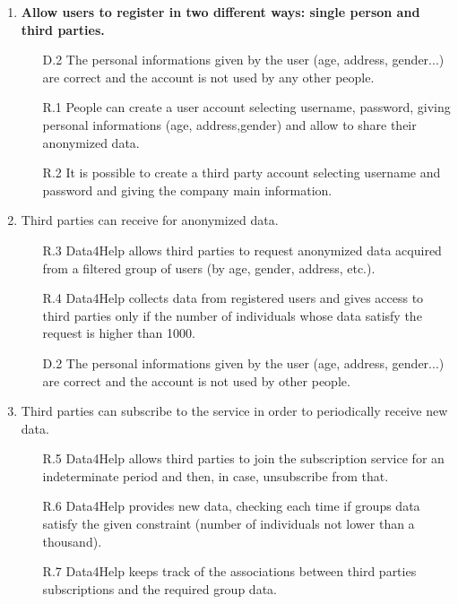 \documentclass[a4paper]{article}
\begin{document}
    \begin{enumerate}[label*=\bf{G.\arabic*}]
        
        
        \item \textbf{Allow users to register in two different ways: single person and third parties.}
        
        \begin{enumerate}
            \item [D.2] The personal informations given by the user (age, address, gender...) are correct and the account is not used by any other people. 
            \item [R.1] People can create a user account selecting username, password, giving personal informations (age, address,gender) and allow to share their anonymized data.
            \item [R.2] It is possible to create a third party account selecting username and password and giving the company main information.
        \end{enumerate}
        
        \item Third parties can receive for anonymized data.
                
            \begin{enumerate}
                \item [R.3] Data4Help allows third parties to request anonymized data acquired from a filtered group of users (by age, gender, address, etc.).
                \item [R.4] Data4Help collects data from registered users and gives access to third parties only if the number of individuals whose data satisfy the request is higher than 1000.
                \item [D.2] The personal informations given by the user (age, address, gender...) are correct and the account is not used by other people.
            \end{enumerate}
            
            
        \item Third parties can subscribe to the service in order to periodically receive new data.
        
        \begin{enumerate}
            \item [R.5] Data4Help allows third parties to join the subscription service for an indeterminate period and then, in case, unsubscribe from that.
            \item [R.6] Data4Help provides new data, checking each time if groups data satisfy the given constraint (number of individuals not lower than a thousand).
            \item [R.7] Data4Help keeps track of the associations between third parties subscriptions and the required group data.
        \end{enumerate}
        

\end{enumerate}
\end{document}
